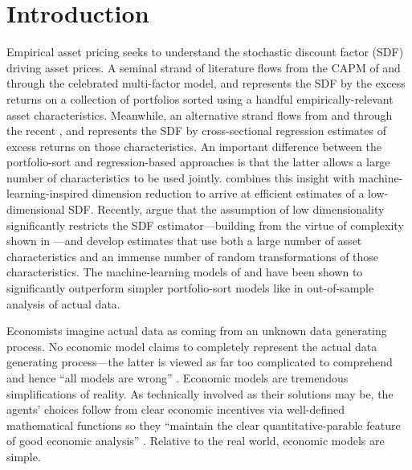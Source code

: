 \documentclass[12pt]{scrarticle}
\begin{document}
\section{Introduction}
Empirical asset pricing seeks to understand the stochastic discount factor (SDF) driving asset prices. A seminal strand of literature flows from the CAPM of \citet{sharpe} and \citet{lintner} through the celebrated \citet{fama-french-2015} multi-factor model, and represents the SDF by the excess returns on a collection of portfolios sorted using a handful empirically-relevant asset characteristics. Meanwhile, an alternative strand flows from \cite{fama-macbeth} and \citet{rosenberg} through the recent \citet{fama_french_2019}, and represents the SDF by cross-sectional regression estimates of excess returns on those characteristics. An important difference between the portfolio-sort and regression-based approaches is that the latter allows a large number of characteristics to be used jointly. \citet*{kps} %
combines this insight with machine-learning-inspired dimension reduction to arrive at efficient estimates of a low-dimensional SDF. Recently, \citet{dkkm} argue that the assumption of low dimensionality significantly restricts the SDF estimator---building from the virtue of complexity shown in \citet*{kelly_malamud_zhou_2024}---and develop estimates that use both a large number of asset characteristics and an immense number of random transformations of those characteristics. The machine-learning models of \citet*{kps} and \citet{dkkm} have been shown to significantly outperform simpler portfolio-sort models like \citet{fama-french-2015} in out-of-sample analysis of actual data.

Economists imagine actual data as coming from an unknown data generating process. No economic model claims to completely represent the actual data generating process---the latter is viewed as far too complicated to comprehend and hence ``all models are wrong'' \citep{box_1976}. Economic models are tremendous simplifications of reality. As technically involved as their solutions may be, the agents' choices follow from clear economic incentives via well-defined mathematical functions so they ``maintain the clear quantitative-parable feature of good economic analysis'' \citep{cochrane2011}.  Relative to the real world, economic models are simple.
\end{document}
